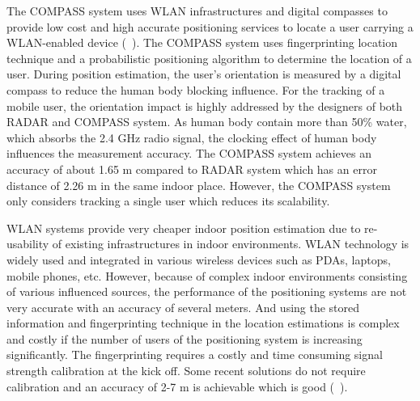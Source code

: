 The COMPASS system uses WLAN infrastructures 
and digital compasses to provide low cost and 
high accurate positioning services to locate
a user carrying a WLAN-enabled device (~\citet{king06}). 
The COMPASS system uses fingerprinting location technique
and a probabilistic positioning algorithm to determine the
location of a user. During position estimation, 
the user’s orientation is measured by a
digital compass to reduce the human body blocking influence.
For the tracking of a mobile user, the orientation impact
is highly addressed by the designers
of both RADAR and COMPASS system. As human body
contain more than 50\% water, which absorbs the 2.4 GHz
radio signal, the clocking effect of human body influences the
measurement accuracy. The COMPASS system achieves an 
accuracy of about 1.65 m compared to RADAR
system which has an error distance of 2.26 m in the same 
indoor place. However, the COMPASS system only considers tracking a
single user which reduces its scalability.

WLAN systems provide very cheaper 
indoor position estimation due to re-usability 
of existing infrastructures in indoor environments. 
WLAN technology is widely used
and integrated in various wireless devices such as PDAs,
laptops, mobile phones, etc. However, because of complex indoor
environments consisting of various influenced sources, 
the performance of the positioning systems are not very
accurate with an accuracy of several meters. And using the
stored information and fingerprinting technique in the location
estimations is complex and costly if the number of users of
the positioning system is increasing significantly.
The fingerprinting requires a costly and time consuming signal 
strength calibration at the kick off. Some recent solutions 
do not require calibration and an accuracy of 2-7 m is achievable 
which is good (~\cite{chintalapudi10}). 

